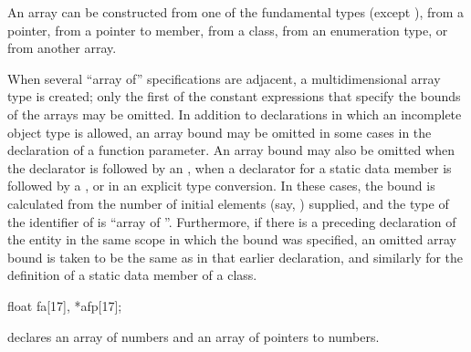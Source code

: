 \pnum
An array can be constructed from one of the fundamental types
(except
),
from a pointer,
from a pointer to member, from a class,
from an enumeration type,
or from another array.

\pnum
{}%
When several ``array of'' specifications are adjacent, a
multidimensional array
type is created;
only the first of
the constant expressions that specify the bounds
of the arrays may be omitted.
In addition to declarations in which an incomplete object type is allowed,
an array bound may be omitted in some cases in the declaration of a function
parameter.
An array bound may also be omitted
when the declarator is followed by an
,
when a declarator for a static data member is followed by a
,
or in an explicit type conversion.
In these cases, the bound is calculated from the number
%
of initial elements (say,
)
supplied,
and the type of the identifier of
is ``array of
''.
Furthermore, if there is a preceding declaration of the entity in the same
scope in which the bound was specified, an omitted array bound is taken to
be the same as in that earlier declaration, and similarly for the definition
of a static data member of a class.

\pnum
\begin{example}
\begin{codeblock}
float fa[17], *afp[17];
\end{codeblock}
declares an array of
numbers and an array of
pointers to
numbers.
\end{example}

